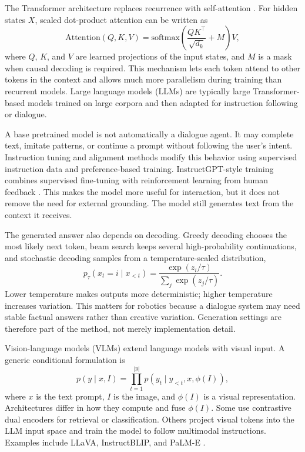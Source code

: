The Transformer architecture replaces recurrence with self-attention \cite{vaswani2023attentionneed}. For hidden states \(X\), scaled dot-product attention can be written as
\[
\mathrm{Attention}(Q,K,V)=\mathrm{softmax}\!\left(\frac{QK^\top}{\sqrt{d_k}}+M\right)V,
\]
where \(Q\), \(K\), and \(V\) are learned projections of the input states, and \(M\) is a mask when causal decoding is required. This mechanism lets each token attend to other tokens in the context and allows much more parallelism during training than recurrent models. Large language models (LLMs) are typically large Transformer-based models trained on large corpora and then adapted for instruction following or dialogue.

A base pretrained model is not automatically a dialogue agent. It may complete text, imitate patterns, or continue a prompt without following the user's intent. Instruction tuning and alignment methods modify this behavior using supervised instruction data and preference-based training. InstructGPT-style training combines supervised fine-tuning with reinforcement learning from human feedback \cite{ouyang2022traininglanguagemodelsfollow}. This makes the model more useful for interaction, but it does not remove the need for external grounding. The model still generates text from the context it receives.

The generated answer also depends on decoding. Greedy decoding chooses the most likely next token, beam search keeps several high-probability continuations, and stochastic decoding samples from a temperature-scaled distribution,
\[
p_\tau(x_t=i\mid x_{<t})=\frac{\exp(z_i/\tau)}{\sum_j \exp(z_j/\tau)}.
\]
Lower temperature makes outputs more deterministic; higher temperature increases variation. This matters for robotics because a dialogue system may need stable factual answers rather than creative variation. Generation settings are therefore part of the method, not merely implementation detail.

Vision-language models (VLMs) extend language models with visual input. A generic conditional formulation is
\[
p(y\mid x,I)=\prod_{t=1}^{|y|}p(y_t\mid y_{<t},x,\phi(I)),
\]
where \(x\) is the text prompt, \(I\) is the image, and \(\phi(I)\) is a visual representation. Architectures differ in how they compute and fuse \(\phi(I)\). Some use contrastive dual encoders for retrieval or classification. Others project visual tokens into the LLM input space and train the model to follow multimodal instructions. Examples include LLaVA, InstructBLIP, and PaLM-E \cite{liu_visual_2023,dai_instructblip_2023,driess_palm-e_2023}.

